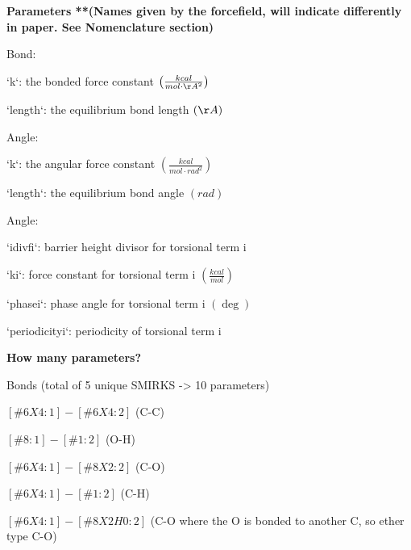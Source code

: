 \documentclass{report}
\begin{document}
\begin{outline}
\begin{figure}[h!]
   \end{figure}
  \item{\bf Parameters **(Names given by the forcefield, will indicate differently in paper. See Nomenclature section)}
  \begin{outline}
    \item{Bond:}
      \begin{outline}
        \item{`k`: the bonded force constant $\left(\frac{kcal}{mol \cdot \AA^2} \right)$}
        \item{`length`: the equilibrium bond length $\left(\AA \right)$}
      \end{outline}
    \item{Angle:}
      \begin{outline}
        \item{`k`: the angular force constant $\left(\frac{kcal}{mol \cdot rad^2} \right)$}
        \item{`length`: the equilibrium bond angle $\left(rad \right)$}
      \end{outline}
    \item{Angle:}
      \begin{outline}
        \item{`idivfi`: barrier height divisor for torsional term i}
        \item{`ki`: force constant for torsional term i $\left(\frac{kcal}{mol} \right)$}
        \item{`phasei`: phase angle for torsional term i $\left( \deg\right)$}
        \item{`periodicityi`: periodicity of torsional term i}
      \end{outline}
  \end{outline}
  \item{\bf How many parameters?}
  \begin{outline}
    \item{Bonds (total of 5 unique SMIRKS -> 10 parameters)}
      \begin{outline}
        \item{$[\#6X4:1]-[\#6X4:2]$ (C-C)}
        \item{$[\#8:1]-[\#1:2]$ (O-H)}
        \item{$[\#6X4:1]-[\#8X2:2]$ (C-O)}
        \item{$[\#6X4:1]-[\#1:2]$ (C-H)}
        \item{$[\#6X4:1]-[\#8X2H0:2]$ (C-O where the O is bonded to another C, so ether type C-O)}
      \end{outline}

\end{outline}
\end{outline}
\end{document}
